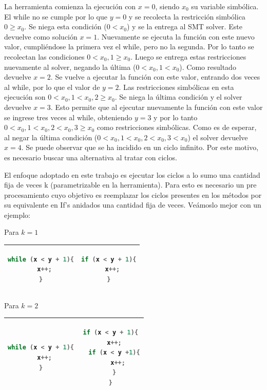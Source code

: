 \documentclass{llncs}
\begin{document}
La herramienta comienza la ejecución con $x=0$, siendo $x_0$ su variable simbólica. El while no se cumple por lo que $y=0$ y se recolecta la restricción simbólica $0 \geq x_0$.
Se niega esta condición ($0<x_0$) y se la entrega al SMT solver. Este devuelve como solución $x=1$. Nuevamente se ejecuta la función con este nuevo valor, cumpliéndose la primera vez
el while, pero no la segunda. Por lo tanto se recolectan las condiciones $0 < x_0, 1 \geq x_0$. Luego se entrega estas restricciones nuevamente al solver, negando la última
($0<x_0, 1<x_0$). Como resultado devuelve $x=2$. Se vuelve a ejecutar la función con este valor, entrando dos veces al while, por lo que el valor de $y=2$. Las restricciones simbólicas
en esta ejecución son $0<x_0, 1<x_0, 2 \geq x_0$. Se niega la última condición y el solver devuelve $x=3$. Esto permite que al ejecutar nuevamente la función con este valor se ingrese
tres veces al while, obteniendo $y=3$ y por lo tanto $0<x_0, 1<x_0, 2<x_0, 3 \geq x_0$ como restricciones simbólicas. Como es de esperar, al negar la última condición
($0<x_0, 1<x_0, 2<x_0, 3<x_0$) el solver devuelve $x=4$. Se puede observar que se ha incidido en un ciclo infinito. Por este motivo, es necesario buscar una alternativa al tratar
con ciclos.

El enfoque adoptado en este trabajo es ejecutar los ciclos a lo sumo una cantidad fija de veces k (parametrizable en la herramienta). Para esto es necesario un pre procesamiento
cuyo objetivo es reemplazar los ciclos presentes en los métodos por su equivalente en If’s anidados una cantidad fija de veces. Veámoslo mejor con un ejemplo:\\
\newline

Para \(k = 1\)
\begin{table}
\centering
\begin{tabular}{|c | c|}
\hline
\begin{lstlisting}[language=Java]
while (x < y + 1){
  x++;
}
\end{lstlisting} & 
\begin{lstlisting}[language=Java]
if (x < y + 1){
  x++;
}
\end{lstlisting}\\
\hline
\end{tabular}
\end{table}

Para \(k = 2\)
\begin{table}
\centering
\begin{tabular}{|c | c|}
\hline
\begin{lstlisting}[language=Java]
while (x < y + 1){
  x++;
}
\end{lstlisting} & 
\begin{lstlisting}[language=Java]
if (x < y + 1){
  x++;
  if (x < y +1){
    x++;
  }
}
\end{lstlisting}\\
\hline
\end{tabular}
\end{table}
\end{document}
